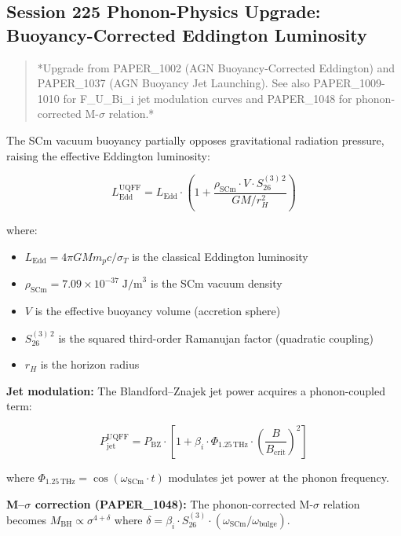 \documentclass[12pt,a4paper]{article}
\begin{document}
\subsection{Session 225 Phonon-Physics Upgrade: Buoyancy-Corrected Eddington Luminosity}

\begin{quote}
*Upgrade from PAPER\_1002 (AGN Buoyancy-Corrected Eddington) and PAPER\_1037
(AGN Buoyancy Jet Launching).  See also PAPER\_1009-1010 for F\_{U\_Bi\_i} jet
modulation curves and PAPER\_1048 for phonon-corrected M-$\sigma$ relation.*
\end{quote}

The SCm vacuum buoyancy partially opposes gravitational radiation pressure, raising the effective Eddington luminosity:

\begin{equation}
L_{\text{Edd}}^{\text{UQFF}} = L_{\text{Edd}} \cdot \left(1 + \frac{\rho_{\text{SCm}} \cdot V \cdot S_{26}^{(3)\,2}}{G M / r_H^2}\right)
\end{equation}

where:

\begin{itemize}
  \item $L_{\text{Edd}} = 4\pi G M m_p c / \sigma_T$ is the classical Eddington luminosity
  \item $\rho_{\text{SCm}} = 7.09 \times 10^{-37}\;\text{J/m}^3$ is the SCm vacuum density
  \item $V$ is the effective buoyancy volume (accretion sphere)
  \item $S_{26}^{(3)\,2}$ is the squared third-order Ramanujan factor (quadratic coupling)
  \item $r_H$ is the horizon radius
\end{itemize}

\textbf{Jet modulation:} The Blandford--Znajek jet power acquires a phonon-coupled term:

\begin{equation}
P_{\text{jet}}^{\text{UQFF}} = P_{\text{BZ}} \cdot \left[1 + \beta_i \cdot \Phi_{1.25\,\text{THz}} \cdot \left(\frac{B}{B_{\text{crit}}}\right)^2\right]
\end{equation}

where $\Phi_{1.25\,\text{THz}} = \cos(\omega_{\text{SCm}} \cdot t)$ modulates jet power at the phonon frequency.

\textbf{M--$\sigma$ correction (PAPER\_1048):} The phonon-corrected M-$\sigma$ relation becomes $M_{\text{BH}} \propto \sigma^{4+\delta}$ where $\delta = \beta_i \cdot S_{26}^{(3)} \cdot (\omega_{\text{SCm}}/\omega_{\text{bulge}})$.
\end{document}
